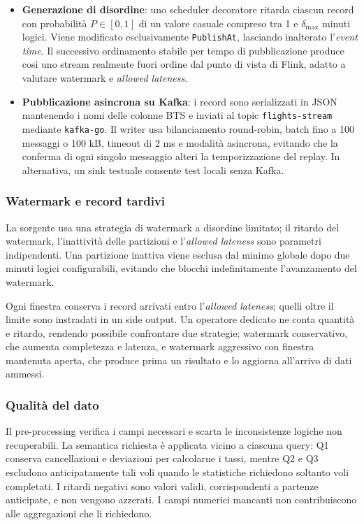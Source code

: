 \documentclass[conference]{IEEEtran}
\begin{document}
\begin{itemize}
    \item \textbf{Generazione di disordine}: uno scheduler decoratore ritarda ciascun record con probabilità $P\in[0,1]$ di un valore casuale compreso tra 1 e $\delta_{\max}$ minuti logici. Viene modificato esclusivamente \texttt{PublishAt}, lasciando inalterato l'\emph{event time}. Il successivo ordinamento stabile per tempo di pubblicazione produce così uno stream realmente fuori ordine dal punto di vista di Flink, adatto a valutare watermark e \emph{allowed lateness}.

    \item \textbf{Pubblicazione asincrona su Kafka}: i record sono serializzati in JSON mantenendo i nomi delle colonne BTS e inviati al topic \texttt{flights-stream} mediante \texttt{kafka-go}. Il writer usa bilanciamento round-robin, batch fino a 100 messaggi o 100 kB, timeout di 2 ms e modalità asincrona, evitando che la conferma di ogni singolo messaggio alteri la temporizzazione del replay. In alternativa, un sink testuale consente test locali senza Kafka.
\end{itemize}

\subsubsection{Watermark e record tardivi}
La sorgente usa una strategia di watermark a disordine limitato; il ritardo del watermark, l'inattività delle partizioni e l'\emph{allowed lateness} sono parametri indipendenti. Una partizione inattiva viene esclusa dal minimo globale dopo due minuti logici configurabili, evitando che blocchi indefinitamente l'avanzamento del watermark.

Ogni finestra conserva i record arrivati entro l'\emph{allowed lateness}; quelli oltre il limite sono instradati in un side output. Un operatore dedicato ne conta quantità e ritardo, rendendo possibile confrontare due strategie: watermark conservativo, che aumenta completezza e latenza, e watermark aggressivo con finestra mantenuta aperta, che produce prima un risultato e lo aggiorna all'arrivo di dati ammessi.

\subsubsection{Qualità del dato}
Il pre-processing verifica i campi necessari e scarta le inconsistenze logiche non recuperabili. La semantica richiesta è applicata vicino a ciascuna query: Q1 conserva cancellazioni e deviazioni per calcolarne i tassi, mentre Q2 e Q3 escludono anticipatamente tali voli quando le statistiche richiedono soltanto voli completati. I ritardi negativi sono valori validi, corrispondenti a partenze anticipate, e non vengono azzerati. I campi numerici mancanti non contribuiscono alle aggregazioni che li richiedono.
\end{document}
